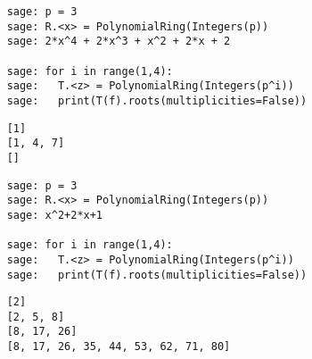 \documentclass[t]{beamer}
\begin{document}
\begin{frame}[fragile]{\fn}
\begin{lstlisting}
	sage: p = 3
	sage: R.<x> = PolynomialRing(Integers(p))
	sage: 2*x^4 + 2*x^3 + x^2 + 2*x + 2
	
	sage: for i in range(1,4):
	sage: 	T.<z> = PolynomialRing(Integers(p^i))
	sage: 	print(T(f).roots(multiplicities=False))	\end{lstlisting}

\begin{lstlisting}
	[1]
	[1, 4, 7]
	[]
\end{lstlisting}
\end{frame}
\begin{frame}[fragile]{\fn}
\begin{lstlisting}
	sage: p = 3
	sage: R.<x> = PolynomialRing(Integers(p))
	sage: x^2+2*x+1
	
	sage: for i in range(1,4):
	sage: 	T.<z> = PolynomialRing(Integers(p^i))
	sage: 	print(T(f).roots(multiplicities=False))	\end{lstlisting}

\begin{lstlisting}
	[2]
	[2, 5, 8]
	[8, 17, 26]
	[8, 17, 26, 35, 44, 53, 62, 71, 80]
\end{lstlisting}
\end{frame}
\end{document}
